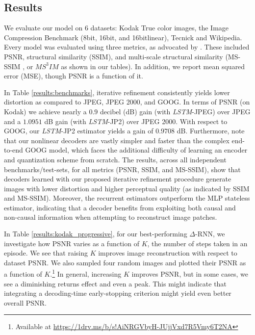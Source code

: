 \documentclass[smallabstract,smallcaptions]{dccpaper}
\begin{document}
\subsection{Results}
We evaluate our model on 6 datasets: Kodak True color images, the Image Compression Benchmark (8bit, 16bit, and 16bitlinear), Tecnick and Wikipedia. Every model was evaluated using three metrics, as advocated by \cite{ma2016group}. These included PSNR, structural similarity (SSIM), and multi-scale structural similarity (MS-SSIM \cite{wang2004imagequality}, or $MS^3IM$ as shown in our tables). In addition, we report mean squared error (MSE), though PSNR is a function of it.

In Table \ref{results:benchmarks}, iterative refinement consistently yields lower distortion as compared to JPEG, JPEG 2000, and GOOG. In terms of PSNR (on Kodak) we achieve nearly a $0.9$ decibel (dB) gain (with \emph{LSTM}-JPEG) over JPEG and a $1.0951$ dB gain (with \emph{LSTM}-JP2) over JPEG 2000. With respect to GOOG, our \emph{LSTM}-JP2 estimator yields a gain of $0.9708$ dB. Furthermore, note that our nonlinear decoders are vastly simpler and faster than the complex end-to-end GOOG model, which faces the additional difficulty of learning an encoder and quantization scheme from scratch. The results, across all independent benchmarks/test-sets, for all metrics (PSNR, SSIM, and MS-SSIM), show that decoders learned with our proposed iterative refinement procedure generate images with lower distortion and higher perceptual quality (as indicated by SSIM and MS-SSIM). Moreover, the recurrent estimators outperform the MLP stateless estimator, indicating that a decoder benefits from exploiting both causal and non-causal information when attempting to reconstruct image patches.

In Table \ref{results:kodak_progressive}, for our best-performing $\Delta$-RNN, we investigate how PSNR varies as a function of $K$, the number of steps taken in an episode. We see that raising $K$ improves image reconstruction with respect to dataset PSNR. We also sampled four random images and plotted their PSNR as a function of $K$.\footnote{Available at \url{https://1drv.ms/b/s!AiNRGVbyH-JUjjVxd7R5Vmy6T2NA}} In general, increasing $K$ improves PSNR, but in some cases, we see a diminishing returns effect and even a peak. This might indicate that integrating a decoding-time early-stopping criterion might yield even better overall PSNR.
\end{document}
